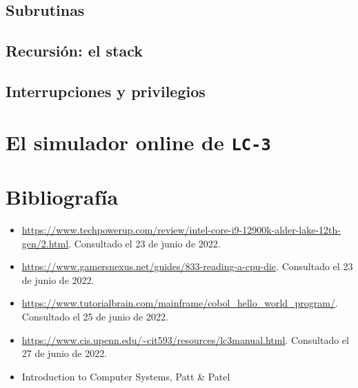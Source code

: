 \documentclass[a4paper, titlepage]{report}
\begin{document}
	\section{Subrutinas}
	
	\section{Recursión: el stack}
	
	\section{Interrupciones y privilegios} %
	
	\chapter{El simulador online de \texttt{LC-3}}
	
	\chapter{Bibliografía} %
	
	\begin{itemize}
		\item \url{https://www.techpowerup.com/review/intel-core-i9-12900k-alder-lake-12th-gen/2.html}. Consultado el 23 de junio de 2022.
		\item \url{https://www.gamersnexus.net/guides/833-reading-a-cpu-die}. Consultado el 23 de junio de 2022.
		\item \url{https://www.tutorialbrain.com/mainframe/cobol_hello_world_program/}. Consultado el 25 de junio de 2022.
		\item \url{https://www.cis.upenn.edu/~cit593/resources/lc3manual.html}. Consultado el 27 de junio de 2022.
		\item Introduction to Computer Systems, Patt \& Patel %
	\end{itemize}
	
\end{document}
